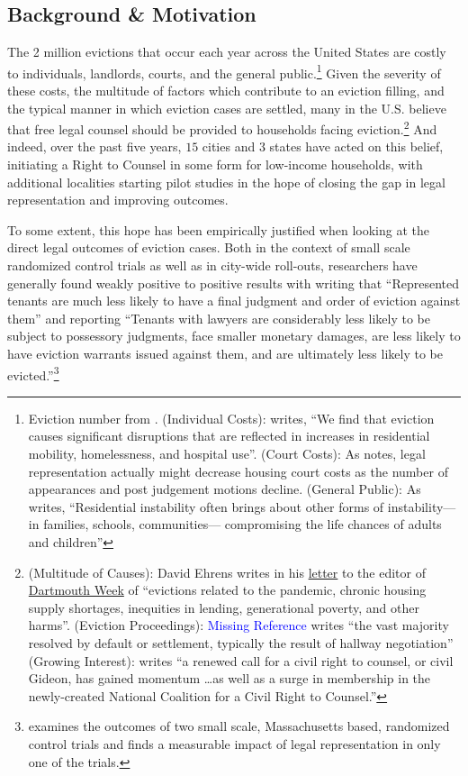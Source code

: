 \documentclass[a4paper,12pt]{article}
\begin{document}
\subsection{Background \& Motivation}
The 2 million evictions that occur each year across the United States are costly to individuals, landlords, courts, and the general public.\footnote{Eviction number from \cite{gromis2022estimating}. (Individual Costs): \cite{collinson2022eviction} writes, ``We find that eviction causes significant disruptions that are reflected in increases in residential mobility, homelessness, and hospital use''. (Court Costs): As \cite{seron2001impact} notes, legal representation actually might decrease housing court costs as the number of appearances and post judgement motions decline. (General Public): As \cite{desmond2019unaffordable} writes, ``Residential instability often brings about other forms of instability—in families, schools, communities— compromising the life chances of adults and children''} Given the severity of these costs, the multitude of factors which contribute to an eviction filling, and the typical manner in which eviction cases are settled, many in the U.S. believe that free legal counsel should be provided to households facing eviction.\footnote{(Multitude of Causes):  David Ehrens writes in his \href{https://dartmouth.theweektoday.com/article/opinion-support-right-counsel-renters/58185}{letter} to the editor of \href{https://dartmouth.theweektoday.com/}{Dartmouth Week} of ``evictions related to the pandemic, chronic housing supply shortages, inequities in lending, generational poverty, and other harms''. (Eviction Proceedings): \textcolor{blue}{Missing Reference} writes ``the vast majority resolved by default or settlement, typically the result of hallway negotiation'' (Growing Interest): \cite{engler2010connecting} writes ``a renewed call for a civil right to counsel, or civil Gideon, has gained momentum \dots as well as a surge in membership in the newly-created National Coalition for a Civil Right to Counsel.''} And indeed, over the past five years, $15$ cities and $3$ states have acted on this belief, initiating a Right to Counsel in some form for low-income households, with additional localities starting pilot studies in the hope of closing the gap in legal representation and improving outcomes. \par 
To some extent, this hope has been empirically justified when looking at the direct legal outcomes of eviction cases. Both in the context of small scale randomized control trials as well as in city-wide roll-outs, researchers have generally found weakly positive to positive results with \cite{seron2001impact}  writing that ``Represented tenants are much less likely to have a final judgment and order of eviction against them'' and \cite{cassidy2022effects} reporting ``Tenants with lawyers are considerably less likely to be subject to possessory judgments, face smaller monetary damages, are less likely to have eviction warrants issued against them, and are ultimately less likely to be evicted.''\footnote{\cite{greiner2012limits} examines the outcomes of two small scale, Massachusetts based, randomized control trials and finds a measurable impact of legal representation in only one of the trials.} \par 
\end{document}
